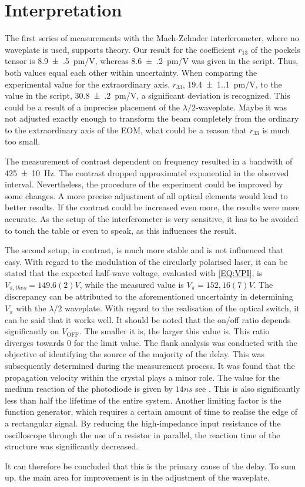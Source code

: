 \section{Interpretation}

The first series of measurements with the Mach-Zehnder interferometer, where no waveplate is used, supports theory. Our result for the coefficient $r_{13}$ of the pockels tensor is \SI{8.9(5)}{pm/V}, whereas \SI{8.6(2)}{pm/V} was given in the script. Thus, both values equal each other within uncertainty. 
When comparing the experimental value for the extraordinary axis, $r_{33}$, \SI{19.4(1.1)}{pm/V}, to the value in the script, \SI{30.8(2)}{pm/V}, a significant deviation is recognized. This could be a result of a imprecise placement of the $\lambda/2$-waveplate. Maybe it was not adjusted exactly enough to transform the beam completely from the ordinary to the extraordinary axis of the EOM, what could be a reason that $r_{33}$ is much too small. 

The measurement of contrast dependent on frequency resulted in a bandwith of \SI{425(10)}{Hz}. The contrast dropped approximatel exponential in the observed interval. 
Nevertheless, the procedure of the experiment could be improved by some changes. A more precise adjustment of all optical elements would lead to better results. If the contrast could be increased even more, the results were more accurate. As the setup of the interferometer is very sensitive, it has to be avoided to touch the table or even to speak, as this influences the result. 

The second setup, in contrast, is much more stable and is not influenced that easy. 
With regard to the modulation of the circularly polarised laser, it can be stated that the expected half-wave voltage, evaluated with \autoref{EQ:VPI}, is $V_{\pi,theo}=149.6(2) \unit{V}$, while the measured value is  $V_\pi=152,16(7) \unit{V}$. The discrepancy can be attributed to the aforementioned uncertainty in determining $V_\pi$ with the $\lambda/2$ waveplate. With regard to the realisation of the optical switch, it can be said that it works well. It should be noted that the on/off ratio depends significantly on $V_\mathrm{OFF}$. The smaller it is, the larger this value is. This ratio diverges towards 0 for the limit value.  The flank analysis was conducted with the objective of identifying the source of the majority of the delay. This was subsequently determined during the measurement process. It was found that the propagation velocity within the crystal plays a minor role.  The value for the medium reaction of the photodiode is given by $14 \unit{ns}$ see \autocite{photodiode}. This is also significantly less than half the lifetime of the entire system. Another limiting factor is the function generator, which requires a certain amount of time to realise the edge of a rectangular signal. By reducing the high-impedance input resistance of the oscilloscope through the use of a resistor in parallel, the reaction time of the structure was significantly decreased.

It can therefore be concluded that this is the primary cause of the delay. To sum up, the main area for improvement is in the adjustment of the waveplate.